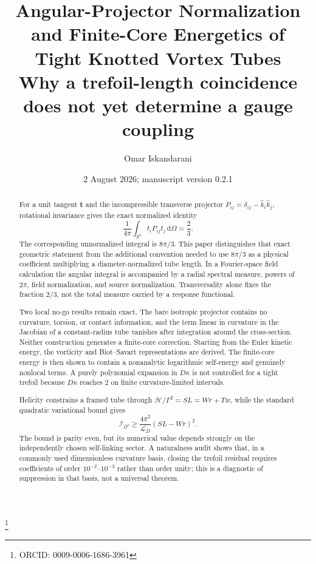 \documentclass[aps,pre,preprint,notitlepage,nofootinbib,superscriptaddress]{revtex4-2}
\newcommand{\dd}{\mathrm d}
\begin{document}
\title{\texorpdfstring{Angular-Projector Normalization and Finite-Core Energetics of Tight Knotted Vortex Tubes\\\large Why a trefoil-length coincidence does not yet determine a gauge coupling}{Angular-Projector Normalization and Finite-Core Energetics of Tight Knotted Vortex Tubes: Why a trefoil-length coincidence does not yet determine a gauge coupling}}

\author{Omar Iskandarani}
\thanks{ORCID: 0009-0006-1686-3961}
\date{2 August 2026; manuscript version 0.2.1}

\begin{abstract}
For a unit tangent $\bm t$ and the incompressible transverse projector $P_{ij}=\delta_{ij}-\widehat{k}_i\widehat{k}_j$, rotational invariance gives the exact normalized identity
\[
\frac{1}{4\pi}\int_{S^2}t_iP_{ij}t_j\,\dd\Omega=\frac23.
\]
The corresponding unnormalized integral is $8\pi/3$.  This paper distinguishes that exact geometric statement from the additional convention needed to use $8\pi/3$ as a physical coefficient multiplying a diameter-normalized tube length.  In a Fourier-space field calculation the angular integral is accompanied by a radial spectral measure, powers of $2\pi$, field normalization, and source normalization.  Transversality alone fixes the fraction $2/3$, not the total measure carried by a response functional.

Two local no-go results remain exact.  The bare isotropic projector contains no curvature, torsion, or contact information, and the term linear in curvature in the Jacobian of a constant-radius tube vanishes after integration around the cross-section.  Neither construction generates a finite-core correction.  Starting from the Euler kinetic energy, the vorticity and Biot--Savart representations are derived.  The finite-core energy is then shown to contain a nonanalytic logarithmic self-energy and genuinely nonlocal terms.  A purely polynomial expansion in $D\kappa$ is not controlled for a tight trefoil because $D\kappa$ reaches $2$ on finite curvature-limited intervals.

Helicity constrains a framed tube through $\mathcal H/\Gamma^2=SL=Wr+Tw$, while the standard quadratic variational bound gives
\[
\mathcal I_{\Omega^2}\geq \frac{4\pi^2}{\mathcal L_D}(SL-Wr)^2.
\]
The bound is parity even, but its numerical value depends strongly on the independently chosen self-linking sector.  A naturalness audit shows that, in a commonly used dimensionless curvature basis, closing the trefoil residual requires coefficients of order $10^{-2}$--$10^{-3}$ rather than order unity; this is a diagnostic of suppression in that basis, not a universal theorem.


\end{abstract}
\end{document}
